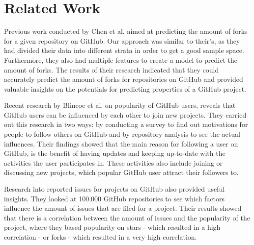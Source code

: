 \section{Related Work}
Previous work conducted by Chen et al. \cite{chen-2014} aimed at predicting the amount of forks for a given repository on GitHub.
Our approach was similar to their's, as they had divided their data into different strata in order to get a good sample space.
Furthermore, they also had multiple features to create a model to predict the amount of forks.
The results of their research indicated that they could accurately predict the amount of forks for repositories on GitHub and provided valuable insights on the potentials for predicting properties of a GitHub project.

Recent research by Blincoe et al. \cite{blincoe-2015} on popularity of GitHub users, reveals that GitHub users can be influenced by each other to join new projects.
They carried out this research in two ways: by conducting a survey to find out motivations for people to follow others on GitHub and by repository analysis to see the actual influences.
Their findings showed that the main reason for following a user on GitHub, is the benefit of having updates and keeping up-to-date with the activities the user participates in.
These activities also include joining or discussing new projects, which popular GitHub user attract their followers to.

Research \cite{bissyande-2013} into reported issues for projects on GitHub also provided useful insights.
They looked at 100.000 GitHub repositories to see which factors influence the amount of issues that are filed for a project.
Their results showed that there is a correlation between the amount of issues and the popularity of the project, where they based popularity on stars - which resulted in a high correlation - or forks - which resulted in a very high correlation.

